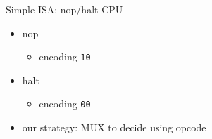 \begin{frame}{Simple ISA: nop/halt CPU}
    \begin{itemize}
    \item nop
        \begin{itemize}
        \item encoding \texttt{10}
        \end{itemize}
    \item halt
        \begin{itemize}
        \item encoding \texttt{00}
        \end{itemize}
    \vspace{.5cm}
    \item<2-> our strategy: MUX to decide using opcode
    \end{itemize}
\end{frame}

